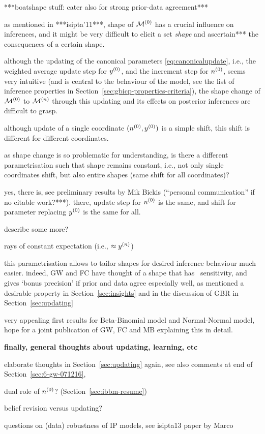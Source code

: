 ***boatshape stuff: cater also for strong prior-data agreement***

as mentioned in ***isipta'11***, shape of $\mathcal{M}^{(0)}$ has a crucial influence on inferences,
and it might be very difficult to elicit a set \emph{shape} and ascertain*** the consequences of a certain shape.

although the updating of the canonical parameters \eqref{eq:canonicalupdate},
i.e., the weighted average update step for $y^{(0)}$, and the increment step for $n^{(0)}$,
seems very intuitive (and is central to the behaviour of the model,
see the list of inference properties in Section~\ref{sec:gbicp-properties-criteria}),
the shape change of $\mathcal{M}^{(0)}$ to $\mathcal{M}^{(n)}$ through this updating and its effects on posterior inferences are difficult to grasp.

although update of a single coordinate $(n^{(0)},y^{(0)})$ is a simple shift,
this shift is different for different coordinates.

as shape change is so problematic for understanding,
is there a different parametrisation such that shape remains constant,
i.e., not only single coordinates shift, but also entire shapes
(same shift for all coordinates)?

yes, there is, see preliminary results by Mik Bickis (``personal communication'' if no citable work?***).
there, update step for $n^{(0)}$ is the same, and shift for parameter replacing $y^{(0)}$ is the same for all. 

describe some more?

rays of constant expectation (i.e., $\approx y^{(n)}$)

this parametrisation allows to tailor shapes for desired inference behaviour much easier.
indeed, GW and FC have thought of a shape that has \pdc\ sensitivity,
and gives `bonus precision' if prior and data agree especially well,
as mentioned a desirable property in Section~\ref{sec:insights}
and in the discussion of GBR in Section~\ref{sec:updating}

very appealing first results for Beta-Binomial model and Normal-Normal model,
hope for a joint publication of GW, FC and MB explaining this in detail.


\textbf{finally, general thoughts about updating, learning, etc}

elaborate thoughts in Section~\ref{sec:updating} again,
see also comments at end of Section~\ref{sec:6-gw-071216},

dual role of $n^{(0)}$? (Section~\ref{sec:ibbm-resume})

belief revision versus updating?

questions on (data) robustness of IP models, see isipta13 paper by Marco


